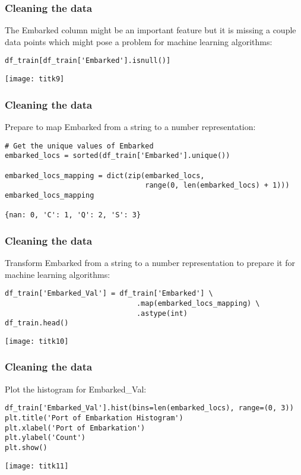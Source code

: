 \begin{frame}[fragile]\frametitle{Cleaning  the data}
The Embarked column might be an important feature but it is missing a couple data points which might pose a problem for machine learning algorithms:
\begin{lstlisting}
df_train[df_train['Embarked'].isnull()]
\end{lstlisting}
\begin{center}
\texttt{[image: titk9]}
\end{center}
\end{frame}


\begin{frame}[fragile]\frametitle{Cleaning  the data}
Prepare to map Embarked from a string to a number representation:
\begin{lstlisting}
# Get the unique values of Embarked
embarked_locs = sorted(df_train['Embarked'].unique())

embarked_locs_mapping = dict(zip(embarked_locs, 
                                 range(0, len(embarked_locs) + 1)))
embarked_locs_mapping

{nan: 0, 'C': 1, 'Q': 2, 'S': 3}
\end{lstlisting}
\end{frame}

\begin{frame}[fragile]\frametitle{Cleaning  the data}
Transform Embarked from a string to a number representation to prepare it for machine learning algorithms:
\begin{lstlisting}
df_train['Embarked_Val'] = df_train['Embarked'] \
                               .map(embarked_locs_mapping) \
                               .astype(int)
df_train.head()
\end{lstlisting}
\begin{center}
\texttt{[image: titk10]}
\end{center}
\end{frame}

\begin{frame}[fragile]\frametitle{Cleaning  the data}
Plot the histogram for Embarked\_Val:
\begin{lstlisting}
df_train['Embarked_Val'].hist(bins=len(embarked_locs), range=(0, 3))
plt.title('Port of Embarkation Histogram')
plt.xlabel('Port of Embarkation')
plt.ylabel('Count')
plt.show()
\end{lstlisting}
\begin{center}
\texttt{[image: titk11]}
\end{center}

\end{frame}

